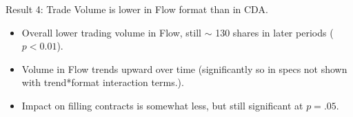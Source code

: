 \documentclass[10pt]{beamer}
\begin{document}
\begin{frame}{Result 4: Trade Volume is lower in Flow format than in CDA.}
\begin{itemize}
\item Overall lower trading volume in Flow, still $\sim$ 130 shares in later periods ($p < 0.01$).
\item Volume in Flow trends upward over time (significantly so in specs not shown with trend*format interaction terms.).
\item Impact on filling contracts is somewhat less, but still significant at $p=.05$.
\end{itemize}   
\end{frame}





\end{document}
